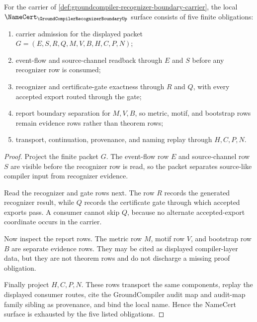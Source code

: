 \begin{theorem}
\label{thm:groundcompiler-recognizer-boundary-namecert-obligations}
For the carrier of \autoref{def:groundcompiler-recognizer-boundary-carrier}, the local $\NameCert_{\GroundCompilerRecognizerBoundaryUp}$ surface consists of five finite obligations:
\begin{enumerate}
\item carrier admission for the displayed packet $G=(E,S,R,Q,M,V,B,H,C,P,N)$;
\item event-flow and source-channel readback through $E$ and $S$ before any recognizer row is consumed;
\item recognizer and certificate-gate exactness through $R$ and $Q$, with every accepted export routed through the gate;
\item report boundary separation for $M,V,B$, so metric, motif, and bootstrap rows remain evidence rows rather than theorem rows;
\item transport, continuation, provenance, and naming replay through $H,C,P,N$.
\end{enumerate}
\end{theorem}
\begin{proof}
Project the finite packet $G$. The event-flow row $E$ and source-channel row $S$ are visible before the recognizer row is read, so the packet separates source-like compiler input from recognizer evidence.

Read the recognizer and gate rows next. The row $R$ records the generated recognizer result, while $Q$ records the certificate gate through which accepted exports pass. A consumer cannot skip $Q$, because no alternate accepted-export coordinate occurs in the carrier.

Now inspect the report rows. The metric row $M$, motif row $V$, and bootstrap row $B$ are separate evidence rows. They may be cited as displayed compiler-layer data, but they are not theorem rows and do not discharge a missing proof obligation.

Finally project $H,C,P,N$. These rows transport the same components, replay the displayed consumer routes, cite the GroundCompiler audit map and audit-map family sibling as provenance, and bind the local name. Hence the NameCert surface is exhausted by the five listed obligations.
\end{proof}

